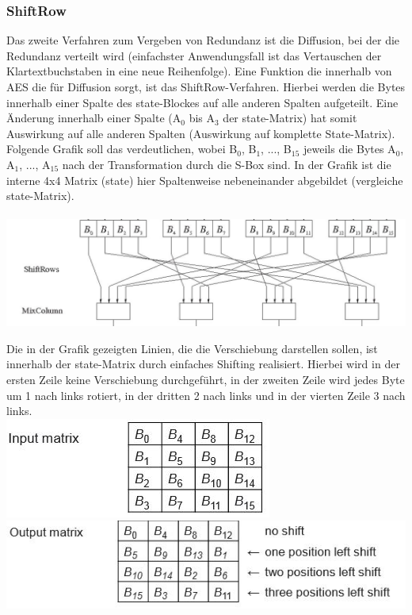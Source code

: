 \documentclass[10pt, a4paper,headsepline]{scrreprt}
\begin{document}
\subsubsection{ShiftRow}
Das zweite Verfahren zum Vergeben von Redundanz ist die Diffusion, bei der die Redundanz verteilt wird (einfachster Anwendungsfall ist das Vertauschen der Klartextbuchstaben in eine neue Reihenfolge). Eine Funktion die innerhalb von AES die für Diffusion sorgt, ist das ShiftRow-Verfahren. Hierbei werden die Bytes innerhalb einer Spalte des state-Blockes auf alle anderen Spalten aufgeteilt. Eine Änderung innerhalb einer Spalte (A$_{0}$ bis A$_{3}$ der state-Matrix) hat somit Auswirkung auf alle anderen Spalten (Auswirkung auf komplette State-Matrix). Folgende Grafik soll das verdeutlichen, wobei B$_{0}$, B$_{1}$, ..., B$_{15}$ jeweils die Bytes A$_{0}$, A$_{1}$, ..., A$_{15}$ nach der Transformation durch die S-Box sind. In der Grafik ist die interne 4x4 Matrix (state) hier Spaltenweise nebeneinander abgebildet (vergleiche state-Matrix).  \\ \\

\includegraphics[scale=0.5]{aes_Shift_Row.JPG} 
\hfill

Die in der Grafik gezeigten Linien, die die Verschiebung darstellen sollen, ist innerhalb der state-Matrix durch einfaches Shifting realisiert. Hierbei wird in der ersten Zeile keine Verschiebung durchgeführt, in der zweiten Zeile wird jedes Byte um 1 nach links rotiert, in der dritten 2 nach links und in der vierten Zeile 3 nach links. \\

\includegraphics[scale=0.5]{shift_row_before.JPG}
\includegraphics[scale=0.5]{shift_row_after.JPG} 
\hfill
\end{document}
